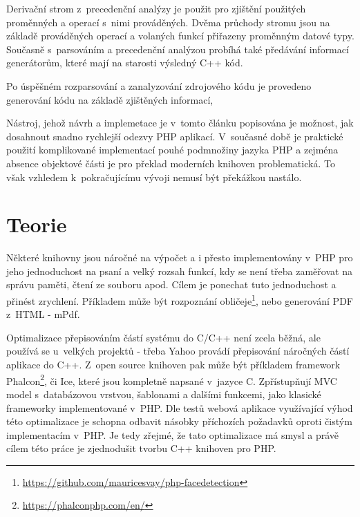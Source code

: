 \documentclass[czech]{ExcelAtFIT}
\begin{document}

		Derivační strom z~precedenční analýzy je použit pro zjištění použitých proměnných a operací s~nimi prováděných. Dvěma průchody stromu jsou na základě prováděných operací a volaných funkcí přiřazeny proměnným datové typy. Současně s~parsováním a precedenční analýzou probíhá také předávání informací generátorům, které mají na starosti výsledný C++ kód.

		Po úspěšném rozparsování a zanalyzování zdrojového kódu je provedeno generování kódu na základě zjištěných informací,


		Nástroj, jehož návrh a implemetace je v~tomto článku popisována je možnost, jak dosahnout snadno rychlejší odezvy PHP aplikací. V~současné době je praktické použití komplikované implementací pouhé podmnožiny jazyka PHP a zejména absence objektové části je pro překlad moderních knihoven problematická. To však vzhledem k~pokračujícímu vývoji nemusí být překážkou nastálo.






\section{Teorie}

	Některé knihovny jsou náročné na výpočet a i přesto implementovány v~PHP pro jeho jednoduchost na psaní a velký rozsah funkcí, kdy se není třeba zaměřovat na správu paměti, čtení ze souboru apod. Cílem je ponechat tuto jednoduchost a přinést zrychlení. Příkladem může být rozpoznání obličeje\footnote{\url{https://github.com/mauricesvay/php-facedetection}}, nebo generování PDF z~HTML - mPdf.

	Optimalizace přepisováním částí systému do C/C++ není zcela běžná, ale používá se u~velkých projektů - třeba Yahoo provádí přepisování náročných částí aplikace do C++\cite{yahooCpp}. Z~open source knihoven pak může být příkladem framework Phalcon\footnote{\url{https://phalconphp.com/en/}}, či Ice, které jsou kompletně napsané v~jazyce C. Zpřístupňují MVC model s~databázovou vrstvou, šablonami a dalšími funkcemi, jako klasické frameworky implementované v~PHP. Dle testů\cite{phalconBenchmark} webová aplikace využívající výhod této optimalizace je schopna odbavit násobky příchozích požadavků oproti čistým implementacím v~PHP. Je tedy zřejmé, že tato optimalizace má smysl a právě cílem této práce je zjednodušit tvorbu C++ knihoven pro PHP.
\end{document}
